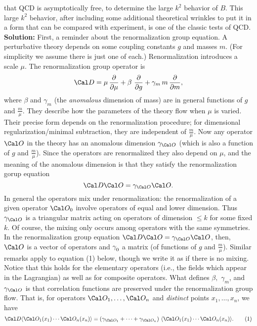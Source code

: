 that QCD is asymptotically free, to determine the large
$k^2$ behavior of $B$.
\endroster
\medskip
This large $k^2$ behavior, after including some additional
theoretical wrinkles to put it in a form that can be
compared with experiment, is one of the classic tests of
QCD.
\bigskip
\noindent
{\bf Solution:}
\medskip
First, a reminder about the renormalization group equation.
A perturbative theory depends on some coupling constants
$g$ and masses $m$.  (For simplicity we assume there is
just one of each.)  Renormalization introduces a scale
$\mu$.  The renormalization group operator is 
$$
\Cal
D=\mu\,\frac{\partial}{\partial\mu}+\beta\,\,\frac{\partial}
{\partial g}+\gamma_m\,m\,\frac{\partial}{\partial m},
$$
where $\beta$ and $\gamma_m$ (the {\it anomalous} dimension
of mass) are in general functions of $g$ and
$\frac{m}{\mu}$.  They describe how the parameters of the
theory flow when $\mu$ is varied.  Their precise form
depends on the renormalization procedure; for dimensional
regularization/minimal subtraction, they are independent of
$\frac{m}{\mu}$.  Now any operator $\Cal O$ in the theory
has an anomalous dimension $\gamma_{\Cal O}$ (which is also a
function of $g$ and $\frac{m}{\mu}$).
Since the operators are renormalized they also depend on
$\mu$, and the meaning of the anomalous dimension is that
they satisfy the renormalization gorup equation
$$
\Cal D\Cal O=\gamma_{\Cal O}\Cal O.
$$
In general the operators mix under renormalization:  the
renormalization of a given operator $\Cal O_0$ involve
operators of equal and lower dimension.  Thus $\gamma_{\Cal
O}$ is a triangular matrix acting on operators of dimension
$\leq k$ for some fixed $k$.  Of course, the mixing only
occurs among operators with the same symmetries.  In the
renormalization group equation $\Cal D\Cal O=\gamma_{\Cal
O}\Cal O$, then, $\Cal O$ is a vector of operators and
$\gamma_{\lower 2pt\hbox{$\scriptstyle 0$}}$ a matrix (of functions of $g$ and
$\frac{m}{\mu}$).  Similar remarks apply to equation (1)
below, though we write it as if there is no mixing.  Notice
that this holds for the elementary operators (i.e., the
fields which appear in the Lagrangian) as well as for
composite operators.  What defines $\beta,\,\,\gamma_m$,
and $\gamma_{\Cal O}$ is that correlation functions are
preserved under the renormalization group flow.  That is,
for operators $\Cal O_1,\ldots,\Cal O_n$ and {\it
distinct} points $x_1,\ldots,x_n$, we have
$$
\Cal D\langle\Cal O_1(x_1)\cdots\Cal
O_n(x_n)\rangle=(\gamma_{\Cal O_1}+\cdots+\gamma_{\Cal
O_n})\,\,\langle\Cal O_1(x_1)\cdots\Cal
O_n(x_n)\rangle.\tag1
$$

